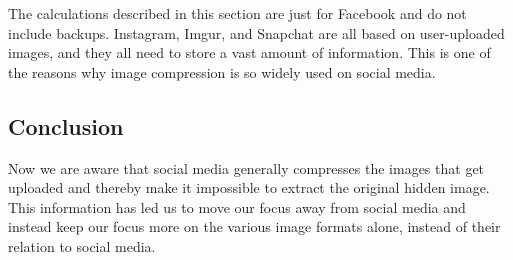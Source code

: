The calculations described in this section are just for Facebook and do not include backups.
Instagram, Imgur, and Snapchat are all based on user-uploaded images, and they all need to store a vast amount of information.
This is one of the reasons why image compression is so widely used on social media.

\subsection*{Conclusion}
Now we are aware that social media generally compresses the images that get uploaded and thereby make it impossible to extract the original hidden image.
This information has led us to move our focus away from social media and instead keep our focus more on the various image formats alone, instead of their relation to social media.
